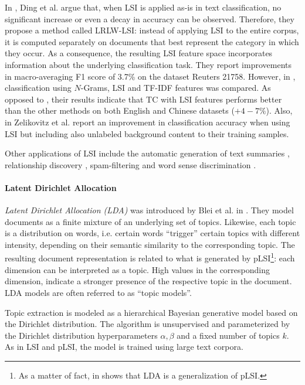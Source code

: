In \cite{Ding2008}, Ding et al. argue that, when LSI is applied as-is
in text classification, no significant increase or even a decay in accuracy can
be observed. Therefore, they propose a method called LRLW-LSI: instead of
applying LSI to the entire corpus, it is computed separately on documents that
best represent the category in which they occur. As a consequence, the resulting
LSI feature space incorporates information about the underlying classification
task. They report improvements in macro-averaging F1 score of 3.7\% on the
dataset Reuters 21758. However, in \cite{Zhang2011}, classification using
$N$-Grams, LSI and TF-IDF features was compared. As opposed to \cite{Ding2008},
their results indicate that TC with LSI features performs better than the other
methods on both English and Chinese datasets ($+4-7 \%$). Also, in
\cite{Zelikovitz2001} Zelikovitz et al. report an improvement in classification
accuracy when using LSI but including also unlabeled background content to
their training samples.

Other applications of LSI include the automatic generation of text summaries
\cite{gong2001generic}, relationship discovery \cite{Bradford2005},
spam-filtering \cite{gee2003using} and word sense discrimination 
\cite{pino2009application}.

\paragraph{Latent Dirichlet Allocation} 
\label{par:lda} \emph{Latent Dirichlet Allocation (LDA)} was introduced by Blei
et al. in \cite{Blei2003}. They model documents as a finite mixture of an
underlying set of topics. Likewise, each topic is a distribution on words, i.e.
certain words ``trigger'' certain topics with different intensity, depending on
their semantic similarity to the corresponding topic. The resulting document
representation is related to what is generated by pLSI\footnote{As a matter of fact,
in \cite{Girolami2003} shows that LDA is a generalization of pLSI.}: each dimension can be interpreted as
a topic. High values in the corresponding dimension, indicate a stronger presence of 
the respective topic in the document. LDA models are often referred to as ``topic models''.  

Topic extraction is modeled as a hierarchical Bayesian generative model based on
the Dirichlet distribution. The algorithm is unsupervised and parameterized by
the Dirichlet distribution hyperparameters $\alpha, \beta$ and a fixed number of topics $k$. As in LSI and
pLSI, the model is trained using large text corpora.   


